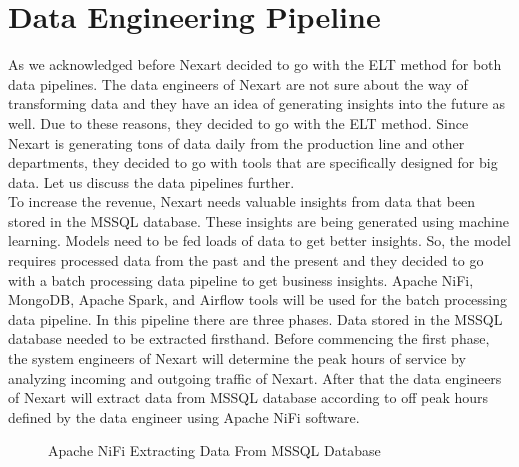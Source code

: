 \documentclass[a4Paper,12pt]{report}
\begin{document}
\section{Data Engineering Pipeline}
As we acknowledged before Nexart decided to go with the ELT method for both data pipelines. The data engineers of Nexart are not sure about the way of transforming data and they have an idea of generating insights into the future as well. Due to these reasons, they decided to go with the ELT method. Since Nexart is generating tons of data daily from the production line and other departments, they decided to go with tools that are specifically designed for big data. Let us discuss the data pipelines further.\\[12pt]
To increase the revenue, Nexart needs valuable insights from data that been stored in the MSSQL database. These insights are being generated using machine learning. Models need to be fed loads of data to get better insights. So, the model requires processed data from the past and the present and they decided to go with a batch processing data pipeline to get business insights. Apache NiFi, MongoDB, Apache Spark, and Airflow tools will be used for the batch processing data pipeline. In this pipeline there are three phases. Data stored in the MSSQL database needed to be extracted firsthand. Before commencing the first phase, the system engineers of Nexart will determine the peak hours of service by analyzing incoming and outgoing traffic of Nexart. After that the data engineers of Nexart will extract data from MSSQL database according to off peak hours defined by the data engineer using Apache NiFi software.\\[12pt]
\begin{figure}[H]
\centering
{}
\caption{Apache NiFi Extracting Data From MSSQL Database}
\end{figure}
\end{document}
